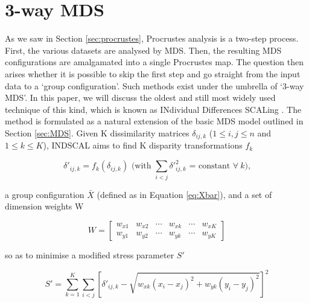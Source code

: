 \documentclass{article}
\begin{document}
\section{3-way MDS}
\label{sec:indscal}

As we saw in Section \ref{sec:procrustes}, Procrustes analysis is a
two-step process. First, the various datasets are analysed by
MDS. Then, the resulting MDS configurations are amalgamated into a
single Procrustes map. The question then arises whether it is possible
to skip the first step and go straight from the input data to a `group
configuration'.  Such methods exist under the umbrella of `3-way MDS'.
In this paper, we will discuss the oldest and still most widely used
technique of this kind, which is known as INdividual Differences
SCALing \citep[INDSCAL,][]{carroll1970}. The method is formulated as a
natural extension of the basic MDS model outlined in Section
\ref{sec:MDS}.  Given K dissimilarity matrices $\delta_{ij,k}$ ($1
\leq i,j \leq n$ and $1 \leq k \leq K$), INDSCAL aims to find K
disparity transformations $f_k$

\begin{equation}
\delta'_{ij,k} = f_k(\delta_{ij,k}) \mbox{ (with }
\sum_{i<j}\delta'^{2}_{ij,k} \mbox{ = constant } \forall~k \mbox{),}
\label{eq:fk}
\end{equation}

a group configuration $\bar{X}$ (defined as in Equation
\ref{eq:Xbar}), and a set of dimension weights W

\begin{equation}
W = \left[
\begin{array}{cccccc}
w_{x1} & w_{x2} & \cdots & w_{xk} & \cdots & w_{xK}\\
w_{y1} & w_{y2} & \cdots & w_{yk} & \cdots & w_{yK}
\end{array}
\right]
\label{eq:W}
\end{equation}

so as to minimise a modified stress parameter $S'$

\begin{equation}
S' = \sum\limits_{k=1}^{K} \sum\limits_{i<j} 
\left[\delta'_{ij,k} - \sqrt{w_{xk}(x_i-x_j)^2 + w_{yk}(y_i-y_j)^2}\right]^2
\label{eq:stress'}
\end{equation}
\end{document}
